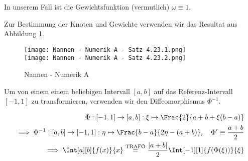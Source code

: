 \begin{solution}

In unserem Fall ist die Gewichtsfunktion (vermutlich) $\omega \equiv 1$.


Zur Bestimmung der Knoten und Gewichte verwenden wir das Resultat aus Abbildung \ref{fig:NNAS4.23}.

\begin{figure}[h!]
  \begin{boxedin}
    \begin{center}
      \texttt{[image: Nannen - Numerik A - Satz 4.23.1.png]} \\
      \vspace{0.5 cm}
      \texttt{[image: Nannen - Numerik A - Satz 4.23.2.png]}
      \caption{Nannen - Numerik A}
      \label{fig:NNAS4.23}
    \end{center}
  \end{boxedin}
\end{figure}

Um von einem einem beliebigen Intervall $[a, b]$ auf das Referenz-Intervall $[-1, 1]$ zu transformieren, verwenden wir den Diffeomorphismus $\Phi^{-1}$.

\begin{align*}
  \Phi:
  [-1, 1] \to [a, b]:
  \xi \mapsto \Frac{2}{a + b + \xi (b - a)} \\
  \implies
  \Phi^{-1}:
  [a, b] \to [-1, 1]:
  \eta \mapsto \Frac{b-a}{2 \eta - (a + b)},
  \quad
  \Phi^\prime \equiv \frac{a + b}{2} \\
  \implies
  \Int[a][b]{f(x)}{x}
  \stackrel{\text{TRAFO}}{=}
  \frac{|a + b|}{2}
  \Int[-1][1]{f(\Phi(\xi))}{\xi}
\end{align*}

\end{solution}

